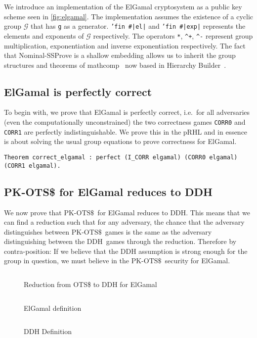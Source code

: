 \documentclass[a4paper,USenglish,cleveref, autoref]{lipics-v2021}
\newcommand{\M}[1]{\texttt{#1}}
\newcommand{\OTSR}{\ensuremath{\mathrm{PK\text{-}OTS\$}}}
\newcommand{\DDH}{\ensuremath{\mathrm{DDH}}}
\begin{document}
We introduce an implementation of the ElGamal cryptosystem as a public key scheme seen in \cref{fig:elgamal}.
The implementation assumes the existence of a cyclic group $\mathcal{G}$
that has \M{g} as a generator.
\M{'fin}\ \texttt{\#}\M{|el|} and \M{'fin}\ \texttt{\#}\M{|exp|} represents the elements and exponents of $\mathcal{G}$ respectively.
The operators \M{*}, \M{^+}, \M{^-} represent group multiplication, exponentiation and inverse exponentiation respectively.
The fact that Nominal-SSProve is a shallow embedding allows us to inherit
the group structures and theorems of mathcomp~\cite{mathcomp-group}
now based in Hierarchy Builder~\cite{hb}.

\subsection{ElGamal is perfectly correct}\label{sec:elgamalcorrect}

To begin with, we prove that ElGamal is perfectly correct,
i.e.\ for all adversaries (even the computationally unconstrained)
the two correctness games \M{CORR0} and \M{CORR1} are perfectly indistinguishable. We prove this in the pRHL and in essence is about solving the usual group
equations to prove correctness for ElGamal.
\begin{verbatim}
Theorem correct_elgamal : perfect (I_CORR elgamal) (CORR0 elgamal) (CORR1 elgamal).
\end{verbatim}

\subsection{PK-OTS\$ for ElGamal reduces to DDH} \label{sec:otsrddh}

We now prove that \OTSR\ for ElGamal reduces to \DDH.
This means that we can find a reduction such that for any adversary,
the chance that the adversary distinguishes between \OTSR\ games is the same as the
adversary distinguishing between the \DDH\ games through the reduction. Therefore by contra-position: If we believe
that the DDH assumption is strong enough for the group in question, we must believe in the \OTSR\ security for ElGamal.

\begin{figure}
  \begin{minipage}[t]{0.49\textwidth}
    \inputminted{coq}{snippets/red.v}
    \caption{Reduction from OTS\$ to DDH for ElGamal}
    \label{fig:red}
  \end{minipage} \hfill \begin{minipage}[t]{0.49\textwidth}
    \inputminted{coq}{snippets/elgamal.v}
    \caption{ElGamal definition}
    \label{fig:elgamal}

    \inputminted{coq}{snippets/ddh.v}
    \caption{DDH Definition}
    \label{fig:ddh}
  \end{minipage}
\end{figure}
\end{document}
